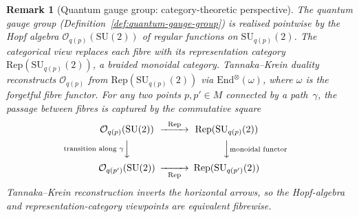 \documentclass[12pt,a4paper]{report}
\newtheorem{remark}[theorem]{Remark}
\begin{document}
\begin{remark}[Quantum gauge group: category-theoretic perspective]
\label{rem:quantum-gauge-group-category}
The quantum gauge group
(Definition~\ref{def:quantum-gauge-group}) is realised pointwise by
the Hopf algebra $\mathcal{O}_{q(p)}(\mathrm{SU}(2))$ of regular
functions on $\mathrm{SU}_{q(p)}(2)$.  The categorical view replaces
each fibre with its representation category
$\mathrm{Rep}(\mathrm{SU}_{q(p)}(2))$, a braided monoidal category.
Tannaka--Krein duality reconstructs $\mathcal{O}_{q(p)}$ from
$\mathrm{Rep}(\mathrm{SU}_{q(p)}(2))$ via
$\mathrm{End}^{\otimes}(\omega)$, where $\omega$ is the forgetful
fibre functor.  For any two points $p, p' \in M$ connected by a
path~$\gamma$, the passage between fibres is captured by the
commutative square
\begin{equation}\label{eq:tannaka-krein-functoriality}
\begin{CD}
\mathcal{O}_{q(p)}(\mathrm{SU}(2))
  @>{\mathrm{Rep}}>>
  \mathrm{Rep}(\mathrm{SU}_{q(p)}(2)) \\
@V{\text{transition along } \gamma}VV
  @VV{\text{monoidal functor}}V \\
\mathcal{O}_{q(p')}(\mathrm{SU}(2))
  @>>{\mathrm{Rep}}>
  \mathrm{Rep}(\mathrm{SU}_{q(p')}(2))
\end{CD}
\end{equation}
Tannaka--Krein reconstruction inverts the horizontal arrows, so the
Hopf-algebra and representation-category viewpoints are equivalent
fibrewise.
\end{remark}
\end{document}
